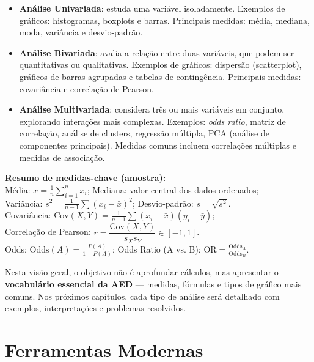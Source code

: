 \begin{itemize}[leftmargin=*]
  \item \textbf{Análise Univariada}: estuda uma variável isoladamente. Exemplos de gráficos: histogramas, boxplots e barras. Principais medidas: média, mediana, moda, variância e desvio-padrão.
  
  \item \textbf{Análise Bivariada}: avalia a relação entre duas variáveis, que podem ser quantitativas ou qualitativas. Exemplos de gráficos: dispersão (scatterplot), gráficos de barras agrupadas e tabelas de contingência. Principais medidas: covariância e correlação de Pearson.
  
  \item \textbf{Análise Multivariada}: considera três ou mais variáveis em conjunto, explorando interações mais complexas. Exemplos: \textit{odds ratio}, matriz de correlação, análise de clusters, regressão múltipla, PCA (análise de componentes principais). Medidas comuns incluem correlações múltiplas e medidas de associação.
\end{itemize}

\begin{FormulaBox}
\textbf{Resumo de medidas-chave (amostra):}\\[4pt]
Média: $\bar{x}=\frac{1}{n}\sum_{i=1}^{n}x_i$;\quad
Mediana: valor central dos dados ordenados;\\[4pt]
Variância: $s^2=\frac{1}{n-1}\sum (x_i-\bar{x})^2$;\quad
Desvio-padrão: $s=\sqrt{s^2}$.\\[4pt]
Covariância: $\mathrm{Cov}(X,Y)=\frac{1}{n-1}\sum (x_i-\bar{x})(y_i-\bar{y})$;\\[4pt]
Correlação de Pearson: $r=\dfrac{\mathrm{Cov}(X,Y)}{s_X s_Y}\in[-1,1]$.\\[4pt]
Odds: $\mathrm{Odds}(A)=\frac{P(A)}{1-P(A)}$;\quad
Odds Ratio (A vs. B): $\mathrm{OR}=\frac{\mathrm{Odds}_A}{\mathrm{Odds}_B}$.
\end{FormulaBox}

Nesta visão geral, o objetivo não é aprofundar cálculos, mas apresentar o \textbf{vocabulário essencial da AED} — medidas, fórmulas e tipos de gráfico mais comuns. Nos próximos capítulos, cada tipo de análise será detalhado com exemplos, interpretações e problemas resolvidos.

\section{Ferramentas Modernas}

